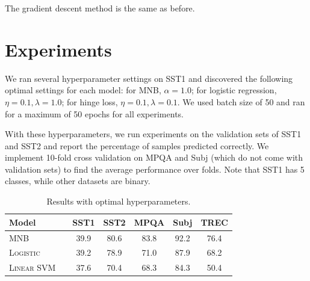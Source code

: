 \documentclass[11pt]{article}
\begin{document}
The gradient descent method is the same as before.


\begin{figure}

  \begin{algorithmic}[1]

    \EndWhile{}
    \EndProcedure{}
  \end{algorithmic}

\end{figure}


\section{Experiments}

We ran several hyperparameter settings on SST1 and discovered the following optimal settings for each model: for MNB, $\alpha = 1.0$; for logistic regression, $\eta = 0.1, \lambda = 1.0$; for hinge loss, $\eta = 0.1, \lambda = 0.1$. We used batch size of 50 and ran for a maximum of 50 epochs for all experiments.

With these hyperparameters, we run experiments on the validation sets of SST1 and SST2 and report the percentage of samples predicted correctly. We implement 10-fold cross validation on MPQA and Subj (which do not come with validation sets) to find the average performance over folds. Note that SST1 has 5 classes, while other datasets are binary.

\begin{table}[h]
\centering
\begin{tabular}{llccccc}
 \toprule
 Model &  & SST1 & SST2 & MPQA & Subj & TREC \\
 \midrule
 \textsc{MNB} & & 39.9 & 80.6 & 83.8 & 92.2 & 76.4\\
 \textsc{Logistic} & & 39.2 & 78.9 & 71.0 & 87.9 & 68.2 \\
 \textsc{Linear SVM} & & 37.6  & 70.4 & 68.3 & 84.3 & 50.4 \\
 \bottomrule
\end{tabular}
\caption{\label{tab:results} Results with optimal hyperparameters.}
\end{table}
\end{document}
